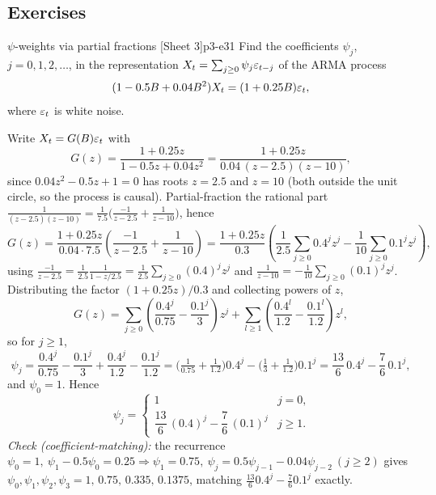\subsection{Exercises}

\begin{exercise}{$\psi$-weights via partial fractions \quad\textnormal{[Sheet 3]}}{p3-e31}
Find the coefficients $\psi_j$, $j=0,1,2,\dots$, in the representation
$X_t=\sum_{j\ge0}\psi_j\varepsilon_{t-j}$ of the ARMA process
\[
(1-0.5B+0.04B^2)X_t=(1+0.25B)\varepsilon_t,
\]
where $\varepsilon_t$ is white noise.
\end{exercise}
\begin{solution}
Write $X_t=G(B)\varepsilon_t$ with
\[
G(z)=\frac{1+0.25z}{1-0.5z+0.04z^2}
=\frac{1+0.25z}{0.04\,(z-2.5)(z-10)},
\]
since $0.04z^2-0.5z+1=0$ has roots $z=2.5$ and $z=10$ (both outside the unit
circle, so the process is causal). Partial-fraction the rational part
$\frac{1}{(z-2.5)(z-10)}=\frac{1}{7.5}\big(\frac{-1}{z-2.5}+\frac{1}{z-10}\big)$,
hence
\[
G(z)=\frac{1+0.25z}{0.04\cdot7.5}\left(\frac{-1}{z-2.5}+\frac{1}{z-10}\right)
=\frac{1+0.25z}{0.3}\left(\frac{1}{2.5}\sum_{j\ge0}0.4^j z^j-\frac{1}{10}\sum_{j\ge0}0.1^j z^j\right),
\]
using $\frac{-1}{z-2.5}=\frac{1}{2.5}\frac{1}{1-z/2.5}=\frac{1}{2.5}\sum_{j\ge0}(0.4)^j z^j$
and $\frac{1}{z-10}=-\frac{1}{10}\sum_{j\ge0}(0.1)^j z^j$. Distributing the
factor $(1+0.25z)/0.3$ and collecting powers of $z$,
\[
G(z)=\sum_{j\ge0}\left(\frac{0.4^j}{0.75}-\frac{0.1^j}{3}\right)z^j
+\sum_{l\ge1}\left(\frac{0.4^l}{1.2}-\frac{0.1^l}{1.2}\right)z^l,
\]
so for $j\ge1$,
\[
\psi_j=\frac{0.4^j}{0.75}-\frac{0.1^j}{3}+\frac{0.4^j}{1.2}-\frac{0.1^j}{1.2}
=\Big(\tfrac{1}{0.75}+\tfrac{1}{1.2}\Big)0.4^j-\Big(\tfrac{1}{3}+\tfrac{1}{1.2}\Big)0.1^j
=\frac{13}{6}\,0.4^j-\frac{7}{6}\,0.1^j,
\]
and $\psi_0=1$. Hence
\[
\boxed{\;\psi_j=\begin{cases}1 & j=0,\\[2pt]
\dfrac{13}{6}\,(0.4)^j-\dfrac{7}{6}\,(0.1)^j & j\ge1.\end{cases}}
\]
\textit{Check (coefficient-matching):} the recurrence
$\psi_0=1,\ \psi_1-0.5\psi_0=0.25\Rightarrow\psi_1=0.75,\
\psi_j=0.5\psi_{j-1}-0.04\psi_{j-2}\ (j\ge2)$ gives
$\psi_0,\psi_1,\psi_2,\psi_3=1,\,0.75,\,0.335,\,0.1375$, matching
$\tfrac{13}{6}0.4^j-\tfrac{7}{6}0.1^j$ exactly.
\end{solution}

